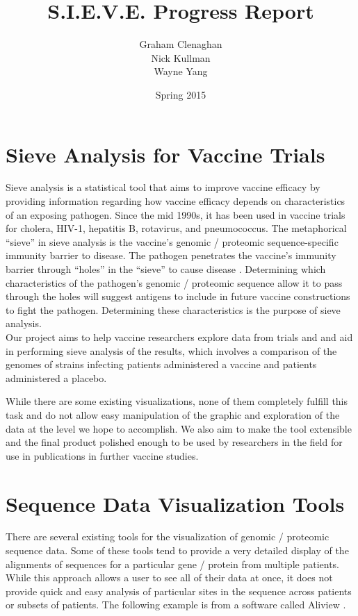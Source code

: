 \documentclass{article}
\begin{document}
\title{S.I.E.V.E. Progress Report}
\author{Graham Clenaghan \\ Nick Kullman \\ Wayne Yang}
\date{Spring 2015}
\maketitle

\section{Sieve Analysis for Vaccine Trials}

Sieve analysis is a statistical tool that aims to improve vaccine efficacy by providing information regarding how vaccine efficacy depends on characteristics of an exposing pathogen. 
Since the mid 1990s, it has been used in vaccine trials for cholera, HIV-1, hepatitis B, rotavirus, and pneumococcus. 
The metaphorical ``sieve'' in sieve analysis is the vaccine's genomic / proteomic sequence-specific immunity barrier to disease. The pathogen penetrates the vaccine's immunity barrier through ``holes'' in the ``sieve'' to cause disease \cite{gilbert2001sieve}.
Determining which characteristics of the pathogen's genomic / proteomic sequence allow it to pass through the holes will suggest antigens to include in future vaccine constructions to fight the pathogen.
Determining these characteristics is the purpose of sieve analysis. 
\\
Our project aims to help vaccine researchers explore data from trials and and aid in performing sieve analysis of the results, which involves a comparison of the genomes of strains infecting patients administered a vaccine and patients administered a placebo.

While there are some existing visualizations, none of them completely fulfill this task and do not allow easy manipulation of the graphic and exploration of the data at the level we hope to accomplish. We also aim to make the tool extensible and the final product polished enough to be used by researchers in the field for use in publications in further vaccine studies.

\section{Sequence Data Visualization Tools}

There are several existing tools for the visualization of genomic / proteomic sequence data.  Some of these tools tend to provide a very detailed display of the alignments of sequences for a particular gene / protein from multiple patients.  While this approach allows a user to see all of their data at once, it does not provide quick and easy analysis of particular sites in the sequence across patients or subsets of patients.  The following example is from a software called Aliview \cite{aliview}.
\end{document}
